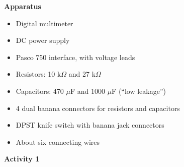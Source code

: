 \makelabheader %

\vspace{0.1in}
\textbf{Apparatus} 
\begin{itemize}%
\setlength\itemsep{-4pt}
\setlength\topsep{-6pt}
\setlength\partopsep{-6pt}
\vspace{-0.2in}  %
\item Digital multimeter 
\item DC power supply 
\item Pasco 750 interface, with voltage leads
\item Resistors: 10 k$\Omega$ and 27 k$\Omega$
\item Capacitors: 470 $\mu$F and 1000 $\mu$F (``low leakage'')
\item 4 dual banana connectors for resistors and capacitors
\item DPST knife switch with banana jack connectors
\item About six connecting wires
\end{itemize}

\textbf{Activity 1}


